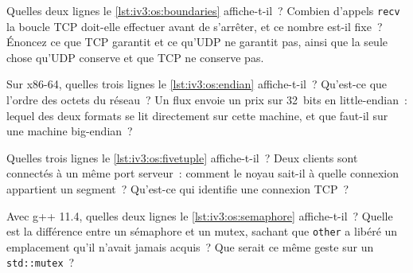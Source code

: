 \begin{question}\label{iq:iv3:operating-systems-concurrency-and-networks:4}
Quelles deux lignes le \cref{lst:iv3:os:boundaries} affiche-t-il~? Combien d'appels \texttt{recv} la boucle TCP doit-elle effectuer avant de s'arrêter, et ce nombre est-il fixe~? Énoncez ce que TCP garantit et ce qu'UDP ne garantit pas, ainsi que la seule chose qu'UDP conserve et que TCP ne conserve pas.
\label{lst:iv3:os:boundaries}
\end{question}

\begin{question}\label{iq:iv3:operating-systems-concurrency-and-networks:5}
Sur x86-64, quelles trois lignes le \cref{lst:iv3:os:endian} affiche-t-il~? Qu'est-ce que l'ordre des octets du réseau~? Un flux envoie un prix sur 32~bits en little-endian~: lequel des deux formats se lit directement sur cette machine, et que faut-il sur une machine big-endian~?
\label{lst:iv3:os:endian}
\end{question}

\begin{question}\label{iq:iv3:operating-systems-concurrency-and-networks:6}
Quelles trois lignes le \cref{lst:iv3:os:fivetuple} affiche-t-il~? Deux clients sont connectés à un même port serveur~: comment le noyau sait-il à quelle connexion appartient un segment~? Qu'est-ce qui identifie une connexion TCP~?
\label{lst:iv3:os:fivetuple}
\end{question}

\begin{question}\label{iq:iv3:operating-systems-concurrency-and-networks:7}
Avec g++ 11.4, quelles deux lignes le \cref{lst:iv3:os:semaphore} affiche-t-il~? Quelle est la différence entre un sémaphore et un mutex, sachant que \texttt{other} a libéré un emplacement qu'il n'avait jamais acquis~? Que serait ce même geste sur un \texttt{std::mutex}~?
\label{lst:iv3:os:semaphore}
\end{question}

